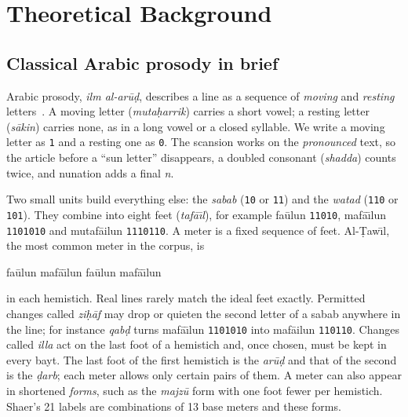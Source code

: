 \section{Theoretical Background}
\label{sec:background}

\subsection{Classical Arabic prosody in brief}
Arabic prosody, \emph{\textquotesingle ilm al-\textquotesingle ar\=u\d{d}}, describes a line as a sequence of
\emph{moving} and \emph{resting} letters~\cite{frolov2000classical}. A moving letter (\emph{muta\d{h}arrik}) carries
a short vowel; a resting letter (\emph{s\=akin}) carries none, as in a long vowel or a closed syllable. We write a
moving letter as \texttt{1} and a resting one as \texttt{0}. The scansion works on the \emph{pronounced} text, so
the article before a ``sun letter'' disappears, a doubled consonant (\emph{shadda}) counts twice, and nunation adds a
final \emph{n}.

Two small units build everything else: the \emph{sabab} (\texttt{10} or \texttt{11}) and the \emph{watad}
(\texttt{110} or \texttt{101}). They combine into eight feet (\emph{taf\={a}\textquotesingle\={\i}l}), for example
fa\textquotesingle\=ulun \texttt{11010}, maf\=a\textquotesingle\={\i}lun \texttt{1101010} and
mutaf\=a\textquotesingle ilun \texttt{1110110}. A meter is a fixed sequence of feet. Al-\d{T}aw\={\i}l, the most
common meter in the corpus, is
\begin{center}
fa\textquotesingle\=ulun \;maf\=a\textquotesingle\={\i}lun \;fa\textquotesingle\=ulun \;maf\=a\textquotesingle\={\i}lun
\end{center}
in each hemistich. Real lines rarely match the ideal feet exactly. Permitted changes called \emph{zi\d{h}\=af} may
drop or quieten the second letter of a sabab anywhere in the line; for instance \emph{qab\d{d}} turns
maf\=a\textquotesingle\={\i}lun \texttt{1101010} into maf\=a\textquotesingle ilun \texttt{110110}. Changes called
\emph{\textquotesingle illa} act on the last foot of a hemistich and, once chosen, must be kept in every bayt. The last
foot of the first hemistich is the \emph{\textquotesingle ar\=u\d{d}} and that of the second is the \emph{\d{d}arb};
each meter allows only certain pairs of them. A meter can also appear in shortened \emph{forms}, such as the
\emph{majz\=u\textquotesingle} form with one foot fewer per hemistich. Shaer's 21 labels are combinations of 13 base
meters and these forms.

